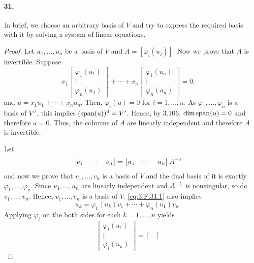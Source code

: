   \paragraph{31.}
    In brief, we choose an arbitrary basis of $V$ and try to express the 
    required basis with it by solving a system of linear equations.
  \begin{proof}
    Let $u_1,\dots,u_n$ be a basis of $V$ and $A=[\varphi_i(u_j)]$. Now we prove
    that $A$ is invertible. Suppose
    \[
      x_1\begin{bmatrix}
        \varphi_1(u_1) \\ \vdots \\ \varphi_n(u_1)
      \end{bmatrix}
      + \cdots +
      x_n\begin{bmatrix}
        \varphi_1(u_n) \\ \vdots \\ \varphi_n(u_n)
      \end{bmatrix}
      = 0.
    \]
    and $u=x_1u_1+\cdots+x_nu_n$. Then, $\varphi_i(u) = 0$ for $i=1,\dots,n$.
    As $\varphi_1,\dots,\varphi_n$ is a basis of $V^\prime$, this implies 
    $(\operatorname{span}(u))^0 = V^\prime$. Hence, by 3.106, $\dim\operatorname{span}(u)=0$ and therefore $u=0$.
    Thus, the columns of $A$ are linearly independent and therefore $A$ is 
    invertible.  \par
    Let
    \begin{equation}
      \label{eq:3.F.31.1}
      \begin{bmatrix}
        v_1 & \cdots & v_n
      \end{bmatrix} =
      \begin{bmatrix}
        u_1 & \cdots & u_n
      \end{bmatrix}A^{-1} 
    \end{equation}
    and now we prove that $v_1,\dots,v_n$ is a basis of $V$ and the dual basis 
    of it is exactly $\varphi_1,\dots,\varphi_n$. Since $u_1,\dots,u_n$ are 
    linearly independent and $A^{-1}$ is nonsingular, so do $v_1,\dots,v_n$. 
    Hence, $v_1,\dots,v_n$ is a basis of $V$. \eqref{eq:3.F.31.1} also implies
    \[
      u_k = \varphi_1(u_k)v_1 + \cdots + \varphi_n(u_1)v_n.
    \]
    Applying $\varphi_i$ on the both sides for each $k=1,\dots,n$ yields 
    \[
      \begin{bmatrix}
        \varphi_i(u_1) \\ \vdots \\ \varphi_i(u_n)
      \end{bmatrix} =
      \begin{bmatrix}

\end{bmatrix}\]
\end{proof}
